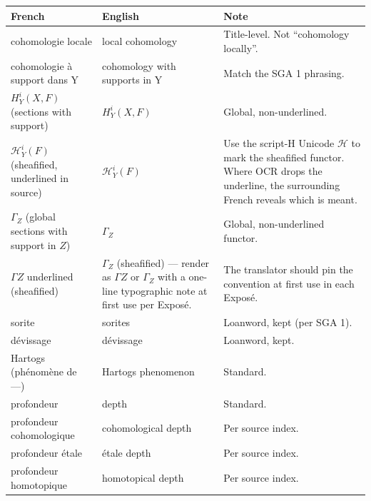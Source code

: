 \documentclass[
  11pt,
  a4paper,
]{book}
\newcounter{none} %
\begin{document}
{\def\LTcaptype{none} %
\begin{longtable}[]{@{}
  >{\raggedright\arraybackslash}p{}
  >{\raggedright\arraybackslash}p{}
  >{\raggedright\arraybackslash}p{}@{}}
\toprule\noalign{}
\begin{minipage}[b]{\linewidth}\raggedright
French
\end{minipage} & \begin{minipage}[b]{\linewidth}\raggedright
English
\end{minipage} & \begin{minipage}[b]{\linewidth}\raggedright
Note
\end{minipage} \\
\midrule\noalign{}
\endhead
\bottomrule\noalign{}
\endlastfoot
cohomologie locale & local cohomology & Title-level. Not ``cohomology
locally''. \\
cohomologie à support dans Y & cohomology with supports in Y & Match the
SGA 1 phrasing. \\
\(H^{i}_{Y}(X, F)\) (sections with support) & \(H^{i}_{Y}(X, F)\) &
Global, non-underlined. \\
\(\mathcal{H}^{i}_{Y}(F)\) (sheafified, underlined in source) &
\(\mathcal{H}^{i}_{Y}(F)\) & Use the script-H Unicode \(\mathcal{H}\) to
mark the sheafified functor. Where OCR drops the underline, the
surrounding French reveals which is meant. \\
\(\Gamma_{Z}\) (global sections with support in \(Z\)) & \(\Gamma_{Z}\)
& Global, non-underlined functor. \\
\(\Gamma Z\) underlined (sheafified) & \(\Gamma_{Z}\) (sheafified) ---
render as \(\Gamma Z\) or \(\Gamma_{Z}\) with a one-line typographic
note at first use per Exposé. & The translator should pin the convention
at first use in each Exposé. \\
sorite & sorites & Loanword, kept (per SGA 1). \\
dévissage & dévissage & Loanword, kept. \\
Hartogs (phénomène de ---) & Hartogs phenomenon & Standard. \\
profondeur & depth & Standard. \\
profondeur cohomologique & cohomological depth & Per source index. \\
profondeur étale & étale depth & Per source index. \\
profondeur homotopique & homotopical depth & Per source index. \\

\end{longtable}}
\end{document}
